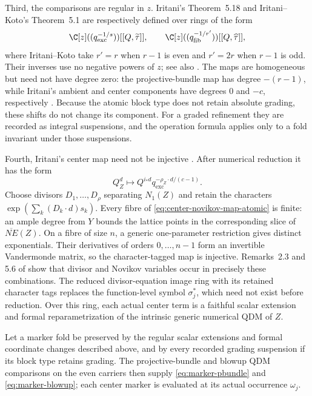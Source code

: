 Third, the comparisons are regular in \(z\).  Iritani's Theorem~5.18 and
Iritani--Koto's Theorem~5.1 are respectively defined over rings of the form
\[
 \C[z]((q_{\mathrm{exc}}^{-1/s}))[[Q,\widetilde\tau]],
 \qquad
 \C[z]((q_{\mathrm{fib}}^{-1/r'}))[[Q,\widehat\tau]],
\]
where Iritani--Koto take \(r'=r\) when \(r-1\) is even and \(r'=2r\) when
\(r-1\) is odd.  Their inverses use no negative powers of \(z\); see also
\cite[Remark~5.3]{IritaniKoto}.  The maps are homogeneous but need not have
degree zero: the projective-bundle map has degree \(-(r-1)\), while Iritani's
ambient and center components have degrees \(0\) and \(-c\), respectively
\cite[Theorem~5.1(3)]{IritaniKoto}\cite[Theorem~5.18(3)]{IritaniBlowup}.
Because the atomic block type does not retain absolute grading, these shifts
do not change its component.  For a graded refinement they are recorded as
integral suspensions, and the operation formula applies only to a fold
invariant under those suspensions.

Fourth, Iritani's center map need not be injective
\cite[(5.15)]{IritaniBlowup}.  After numerical reduction it has the form
\begin{equation}
 Q_Z^d\longmapsto
 Q^{i_*d}q_{\mathrm{exc}}^{-\rho_Z\cdot d/(c-1)}.
 \label{eq:center-novikov-map-atomic}
\end{equation}
Choose divisors \(D_1,\ldots,D_\rho\) separating \(N_1(Z)\) and retain the
characters \(\exp(\sum_k(D_k\cdot d)s_k)\).  Every fibre of
\eqref{eq:center-novikov-map-atomic} is finite: an ample degree from \(Y\)
bounds the lattice points in the corresponding slice of
\(\overline{NE}(Z)\).  On a fibre of size \(n\), a generic one-parameter
restriction gives distinct exponentials.  Their derivatives of orders
\(0,\ldots,n-1\) form an invertible Vandermonde matrix, so the
character-tagged map is injective.
Remarks~2.3 and 5.6 of \cite{IritaniBlowup} show that divisor and Novikov
variables occur in precisely these combinations.  The reduced
divisor-equation image ring with its retained character tags replaces the
function-level symbol \(\sigma_j^*\), which need not exist before reduction.
Over this ring, each actual center term is a faithful scalar extension and
formal reparametrization of the intrinsic generic numerical QDM of \(Z\).

\begin{proposition}
\label{prop:qdm-operation-ledgers}
%
%
%
Let a marker fold be preserved by the regular scalar extensions and formal
coordinate changes described above, and by every recorded grading suspension
if its block type retains grading.  The projective-bundle and blowup QDM
comparisons on the even carriers then supply \eqref{eq:marker-pbundle} and
\eqref{eq:marker-blowup}; each center marker is evaluated at its actual
occurrence \(\omega_j\).
\end{proposition}

